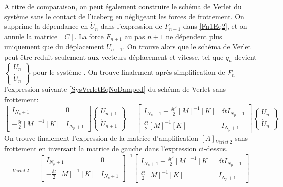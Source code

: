 \documentclass[11pt, a4paper]{article}
\begin{document}
A titre de comparaison, on peut également construire le schéma de Verlet du système sans le contact de l'iceberg en négligeant les forces de frottement. On supprime la dépendance en $\dot{U}_n$ dans l'expression de $F_{n+1}$ dans \ref{Fn1Eq2}, et on annule la matrice $[C]$. La force $F_{n+1}$ au pas $n+1$ ne dépendent plus uniquement que du déplacement $U_{n+1}$. On trouve alors que le schéma de Verlet peut être reduit seulement aux vecteurs déplacement et vitesse, tel que $q_n$ devient $\begin{Bmatrix} U_n \\ \dot{U}_n \end{Bmatrix}$ pour le système  \label{SysVerletEq}. On trouve finalement après simplification de $F_n$ l'expression suivante \ref{SysVerletEqNoDamped} du schéma de Verlet sans frottement:
\begin{equation}
	\begin{bmatrix}
	I_{N_p +1} & 0 \\
	-\frac{\delta t}{2} [M]^{-1} [K] & I_{N_p +1}
	\end{bmatrix}
	\begin{Bmatrix} U_{n+1} \\ \dot{U}_{n+1} \end{Bmatrix} = 
	\begin{bmatrix}
	I_{N_p +1} + \frac{\delta t^2}{2} [M]^{-1} [K] & \delta t I_{N_p +1} \\
	\frac{\delta t}{2} [M]^{-1} [K] & I_{N_p +1}
	\end{bmatrix}
	\begin{Bmatrix} U_{n} \\ \dot{U}_{n} \end{Bmatrix}  
	\label{SysVerletEqNoDamped}
\end{equation} 
On trouve finalement l'expression de la matrice d'amplification $[A]_{Verlet \ 2}$ sans frottement en inversant la matrice de gauche dans l'expression ci-dessus.
\begin{equation}
	[A]_{Verlet \ 2} = \begin{bmatrix}
	I_{N_p +1} & 0 \\
	-\frac{\delta t}{2} [M]^{-1} [K] & I_{N_p +1}
	\end{bmatrix}^{-1}	
	\begin{bmatrix}
	I_{N_p +1} + \frac{\delta t^2}{2} [M]^{-1} [K] & \delta t I_{N_p +1} \\
	\frac{\delta t}{2} [M]^{-1} [K] & I_{N_p +1}
	\end{bmatrix}
	\label{AmatrixVerletExp2}
\end{equation}
\\
\end{document}
